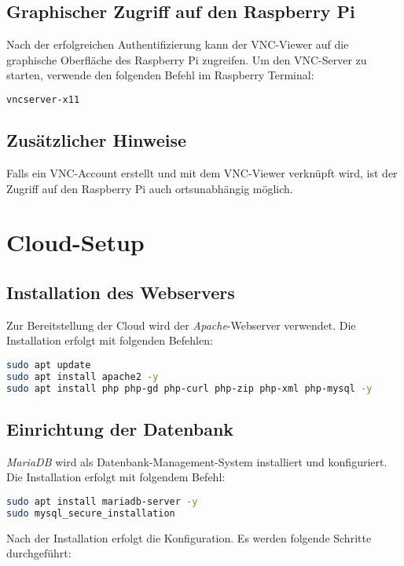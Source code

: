 \documentclass[a4paper,12pt]{article}
\begin{document}
\subsection{Graphischer Zugriff auf den Raspberry Pi}
Nach der erfolgreichen Authentifizierung kann der VNC-Viewer auf die graphische Oberfläche des Raspberry Pi zugreifen. Um den VNC-Server zu starten, verwende den folgenden Befehl im Raspberry Terminal:
\begin{lstlisting}[language=bash]
vncserver-x11
\end{lstlisting}

\subsection{Zusätzlicher Hinweise}
Falls ein VNC-Account erstellt und mit dem VNC-Viewer verknüpft wird, ist der Zugriff auf den Raspberry Pi auch ortsunabhängig möglich.

\section{Cloud-Setup}
\subsection{Installation des Webservers}
Zur Bereitstellung der Cloud wird der \textit{Apache}-Webserver verwendet. Die Installation erfolgt mit folgenden Befehlen:
\begin{lstlisting}[language=bash]
sudo apt update
sudo apt install apache2 -y
sudo apt install php php-gd php-curl php-zip php-xml php-mysql -y
\end{lstlisting}

\subsection{Einrichtung der Datenbank}
\textit{MariaDB} wird als Datenbank-Management-System installiert und konfiguriert. Die Installation erfolgt mit folgendem Befehl:
\begin{lstlisting}[language=bash]
sudo apt install mariadb-server -y
sudo mysql_secure_installation
\end{lstlisting}

\noindent
Nach der Installation erfolgt die Konfiguration. Es werden folgende Schritte durchgeführt:
\end{document}
